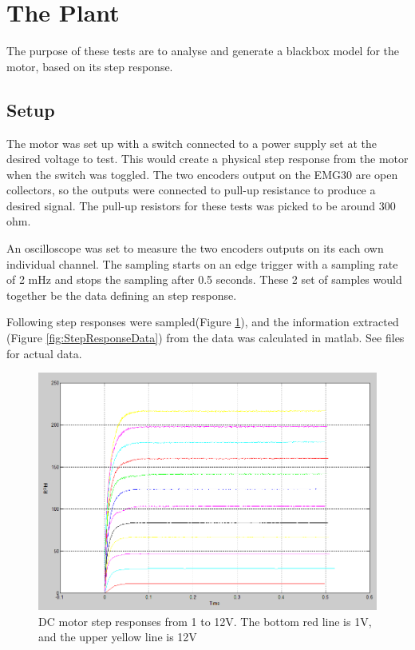 \section{The Plant}
The purpose of these tests are to analyse and generate a blackbox model for the motor, based on its step response. 

\subsection{Setup}

The motor was set up with a switch connected to a power supply set at the desired voltage to test. This would create a physical step response from the motor when the switch was toggled. The two encoders output on the EMG30 are open collectors, so the outputs were connected to pull-up resistance to produce a desired signal. The pull-up resistors for these tests was picked to be around 300 ohm.

An oscilloscope was set to measure the two encoders outputs on its each own individual channel. The sampling starts on an edge trigger with a sampling rate of 2 mHz and stops the sampling after 0.5 seconds.
These 2 set of samples would together be the data defining an step response.

Following step responses were sampled(Figure \ref{fig:stepresponses1to12V}), and the information extracted (Figure \ref{fig:StepResponseData}) from the data was calculated in matlab. See files for actual data.

\begin{figure}[h!]
\centering
\includegraphics[scale=0.4]{Billeder/Stepresponses1to12V.png}
\caption{DC motor step responses from 1 to 12V. The bottom red line is 1V, and the upper yellow line is 12V}
\label{fig:stepresponses1to12V}
\end{figure}

